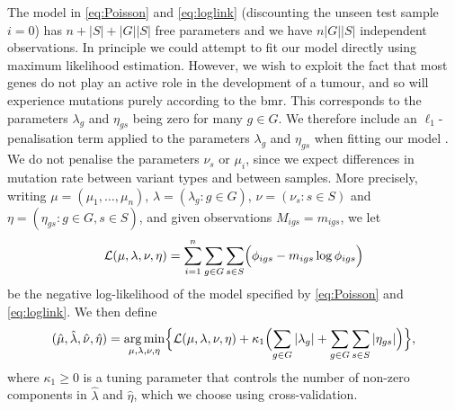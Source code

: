 \documentclass[10pt,twoside,openright]{report}
\DeclareMathOperator*{\argmin}{arg\,min}
\begin{document}
The model in \eqref{eq:Poisson} and \eqref{eq:loglink} (discounting the unseen test sample $i=0$) has $n + |S| + |G||S|$ free parameters and we have $n|G||S|$ independent observations. In principle we could attempt to fit our model directly using maximum likelihood estimation. However, we wish to exploit the fact that most genes do not play an active role in the development of a tumour, and so will experience mutations purely according to the \acrshort{bmr}. This corresponds to the parameters $\lambda_g$ and $\eta_{gs}$ being zero for many $g \in G$. We therefore include an $\ell_1$-penalisation term applied to the parameters $\lambda_g$ and $\eta_{gs}$ when fitting our model \citep{van_de_geer_high-dimensional_2008}. We do not penalise the parameters $\nu_s$ or $\mu_i$, since we expect differences in mutation rate between variant types and between samples. More precisely, writing $\mu = (\mu_1,\ldots, \mu_n)$, $\lambda = (\lambda_g :g \in G)$, $\nu = (\nu_s: s \in S)$ and $\eta = (\eta_{gs}: g\in G, s\in S)$, and given observations $M_{igs} = m_{igs}$, we let
\[
\mathcal{L}(\mu, \lambda, \nu, \eta) = \sum_{i = 1}^n \sum_{g \in G} \sum_{s \in S} \Bigl( \phi_{igs} - m_{igs} \log \phi_{igs} \Bigr) 
\]
be the negative log-likelihood of the model specified by \eqref{eq:Poisson} and \eqref{eq:loglink}. We then define
\begin{equation}
(\hat{\mu}, \hat{\lambda}, \hat{\nu}, \hat{\eta}) = \argmin_{\mu,\lambda, \nu, \eta} \Bigl\{ \mathcal{L}(\mu, \lambda, \nu, \eta) + \kappa_1 \Bigl(\sum_{g \in G} |\lambda_g|  +  \sum_{g \in G} \sum_{s \in S} |\eta_{gs}| \Bigr) \Bigr\},
\label{eq:genparams}
\end{equation}
where $\kappa_1 \geq 0$ is a tuning parameter that controls the number of non-zero components in $\hat{\lambda}$ and $\hat{\eta}$, which we choose using cross-validation. 
\end{document}
